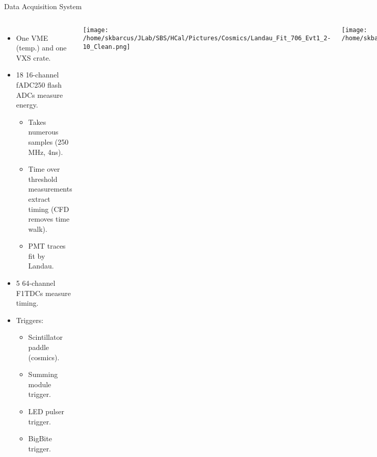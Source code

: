 \documentclass[10pt]{beamer}
\begin{document}
\begin{frame}{Data Acquisition System}

    \begin{columns}[T,onlytextwidth]
  	
  	\begin{itemize}
  		\item One VME (temp.) and one VXS crate.
  		\item 18 16-channel fADC250 flash ADCs measure energy.
  			\begin{itemize}
  				\item[--] Takes numerous samples (250 MHz, 4ns).
  				\item[--] Time over threshold measurements extract timing (CFD removes time walk).
  				\item[--] PMT traces fit by Landau.
  			\end{itemize}
  		\item 5 64-channel F1TDCs measure timing.
  		\item \alert{Triggers:}
  			\begin{itemize}
  				\item[--] Scintillator paddle (cosmics).
  				\item[--] Summing module trigger.
  				\item[--] LED pulser trigger.
  				\item[--] BigBite trigger.
  			\end{itemize}
  	\end{itemize}
  	
	\texttt{[image: /home/skbarcus/JLab/SBS/HCal/Pictures/Cosmics/Landau\_Fit\_706\_Evt1\_2-10\_Clean.png]}
	
\vspace{10mm}	
	
	\texttt{[image: /home/skbarcus/JLab/SBS/HCal/Pictures/Cosmics/Cosmic\_Hit\_run820\_evt16\_Arrow.png]}

	\end{columns}

\end{frame}
\end{document}
